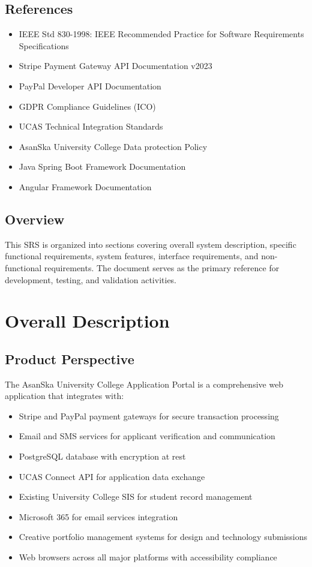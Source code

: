 \documentclass[11pt]{article}
\begin{document}
\subsection{References}
\begin{itemize}
    \item IEEE Std 830-1998: IEEE Recommended Practice for Software Requirements Specifications
    \item Stripe Payment Gateway API Documentation v2023
    \item PayPal Developer API Documentation
    \item GDPR Compliance Guidelines (ICO)
    \item UCAS Technical Integration Standards
    \item AsanSka University College Data protection Policy
    \item Java Spring Boot Framework Documentation
    \item Angular Framework Documentation
\end{itemize}

\subsection{Overview}
This SRS is organized into sections covering overall system description, specific functional requirements, system features, interface requirements, and non-functional requirements. The document serves as the primary reference for development, testing, and validation activities.

\section{Overall Description}

\subsection{Product Perspective}
The AsanSka University College Application Portal is a comprehensive web application that integrates with:
\begin{itemize}
    \item Stripe and PayPal payment gateways for secure transaction processing
    \item Email and SMS services for applicant verification and communication
    \item PostgreSQL database with encryption at rest
    \item UCAS Connect API for application data exchange
    \item Existing University College SIS for student record management
    \item Microsoft 365 for email services integration
    \item Creative portfolio management systems for design and technology submissions
    \item Web browsers across all major platforms with accessibility compliance
\end{itemize}
\end{document}
